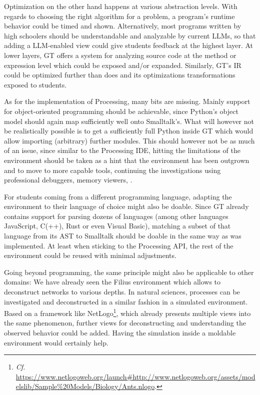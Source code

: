 Optimization on the other hand happens at various abstraction levels. With regards to choosing the right algorithm for a problem, a program's runtime behavior could be timed and shown. Alternatively, most programs written by high schoolers should be understandable and analyzable by current \acp{LLM}, so that adding a \ac{LLM}-enabled view could give students feedback at the highest layer. At lower layers, \ac{GT} offers a  system for analyzing source code at the method or expression level which could be exposed and/or expanded. Similarly, \ac{GT}'s \ac{IR} could be optimized further than  does and its optimizations transformations exposed to students.

As for the implementation of Processing, many bits are missing. Mainly support for object-oriented programming should be achievable, since Python's object model should again map sufficiently well onto Smalltalk's. What will however not be realistically possible is to get a sufficiently full Python inside \ac{GT} which would allow importing (arbitrary) further modules. This should however not be as much of an issue, since similar to the Processing \ac{IDE}, hitting the limitations of the environment should be taken as a hint that the environment has been outgrown and to move to more capable tools, continuing the investigations using professional debuggers, memory viewers, \etc.

For students coming from a different programming language, adapting the environment to their language of choice might also be doable. Since \ac{GT} already contains support for parsing dozens of languages (among other languages JavaScript, C(++), Rust or even Visual Basic), matching a subset of that language from its \ac{AST} to Smalltalk should be doable in the same way as  was implemented. At least when sticking to the Processing \ac{API}, the rest of the environment could be reused with minimal adjustments.

Going beyond programming, the same principle might also be applicable to other domains: We have already seen the Filius environment which allows to deconstruct networks to various depths. In natural sciences, processes can be investigated and deconstructed in a similar fashion in a simulated environment. Based on a framework like NetLogo\footnote{\emph{Cf.} \eg \url{https://www.netlogoweb.org/launch\#http://www.netlogoweb.org/assets/modelslib/Sample\%20Models/Biology/Ants.nlogo}.}, which already presents multiple views into the same phenomenon, further views for deconstructing and understanding the observed behavior could be added. Having the simulation inside a moldable environment would certainly help.

